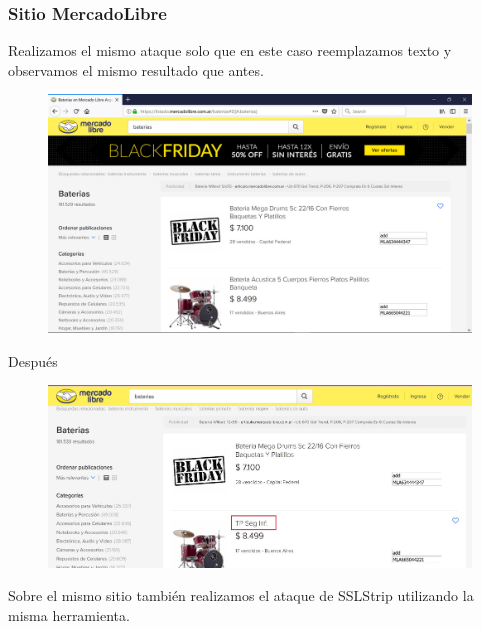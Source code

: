 \documentclass[10pt,a4paper]{article}
\begin{document}
\subsubsection{Sitio MercadoLibre}
Realizamos el mismo ataque solo que en este caso reemplazamos texto y observamos el mismo resultado que antes.
\newline
\begin{figure}[H]
\centerline{\includegraphics[scale=0.19]{images/ml_1.jpg}}
\caption{}
\end{figure}
Después\newline
\begin{figure}[H]
\centerline{\includegraphics[scale=1]{images/ml_2.jpg}}
\caption{}
\end{figure}

Sobre el mismo sitio también realizamos el ataque de SSLStrip utilizando la misma herramienta.
\end{document}
